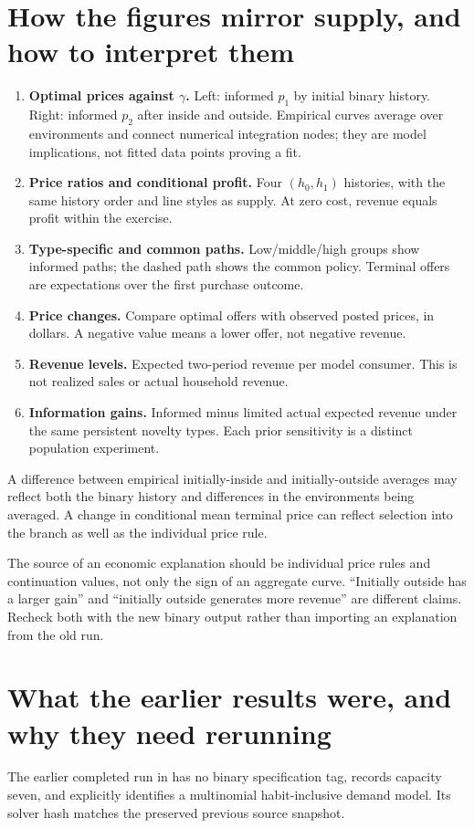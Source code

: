 \documentclass[11pt]{article}
\newcommand{\code}[1]{\texttt{\detokenize{#1}}}
\newcommand{\review}[1]{\begin{tcolorbox}[colback=pale,colframe=navy,title=Decision to verify]#1\end{tcolorbox}}
\begin{document}
\section{How the figures mirror supply, and how to interpret them}
\begin{enumerate}
\item \textbf{Optimal prices against $\gamma$.} Left: informed $p_1$ by initial binary history. Right: informed $p_2$ after inside and outside. Empirical curves average over environments and connect numerical integration nodes; they are model implications, not fitted data points proving a fit.
\item \textbf{Price ratios and conditional profit.} Four $(h_0,h_1)$ histories, with the same history order and line styles as supply. At zero cost, revenue equals profit within the exercise.
\item \textbf{Type-specific and common paths.} Low/middle/high groups show informed paths; the dashed path shows the common policy. Terminal offers are expectations over the first purchase outcome.
\item \textbf{Price changes.} Compare optimal offers with observed posted prices, in dollars. A negative value means a lower offer, not negative revenue.
\item \textbf{Revenue levels.} Expected two-period revenue per model consumer. This is not realized sales or actual household revenue.
\item \textbf{Information gains.} Informed minus limited actual expected revenue under the same persistent novelty types. Each prior sensitivity is a distinct population experiment.
\end{enumerate}

A difference between empirical initially-inside and initially-outside averages may reflect both the binary history and differences in the environments being averaged. A change in conditional mean terminal price can reflect selection into the branch as well as the individual price rule.

\review{The source of an economic explanation should be individual price rules and continuation values, not only the sign of an aggregate curve. ``Initially outside has a larger gain'' and ``initially outside generates more revenue'' are different claims. Recheck both with the new binary output rather than importing an explanation from the old run.}

\section{What the earlier results were, and why they need rerunning}
The earlier completed run in \code{new_pricing_res/} has no binary specification tag, records capacity seven, and explicitly identifies a multinomial habit-inclusive demand model. Its solver hash matches the preserved previous source snapshot.
\end{document}
